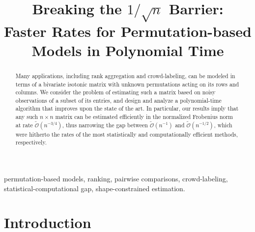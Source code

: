 \documentclass[final,12pt]{colt2018} %
\title[Faster Rates for Permutation-based Models]{Breaking the $1/\sqrt{n}$ Barrier: \\ Faster Rates for Permutation-based Models in Polynomial Time}
\begin{document}
\maketitle

\begin{abstract}
Many applications, including rank aggregation and crowd-labeling, can be modeled in terms of a bivariate isotonic matrix with unknown permutations acting on its rows and columns.  We consider the problem of estimating such a matrix based on noisy observations of a subset of its entries, and design and analyze a polynomial-time algorithm that improves upon the state of the art. In particular, our results imply that any such $n \times n$ matrix can be estimated efficiently in the normalized Frobenius norm at rate $\widetilde{\mathcal O}(n^{-3/4})$, thus narrowing the gap between $\widetilde{\mathcal O}(n^{-1})$ and $\widetilde{\mathcal O}(n^{-1/2})$, which were hitherto the rates of the most statistically and computationally efficient methods, respectively.
\end{abstract}

\begin{keywords}
permutation-based models, ranking, pairwise comparisons,
crowd-labeling, statistical-computational gap, shape-constrained
estimation.
\end{keywords}

\section{Introduction}
\end{document}
